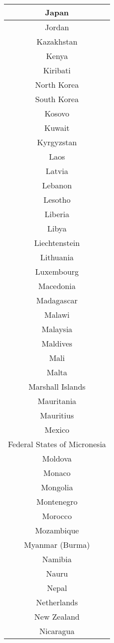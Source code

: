 \documentclass{article}
\begin{document}
\begin{center}
\begin{tabular} {|| c ||}
Japan\\ \hline 
Jordan\\ \hline 
Kazakhstan\\ \hline 
Kenya\\ \hline 
Kiribati\\ \hline 
North Korea\\ \hline 
South Korea\\ \hline 
Kosovo\\ \hline 
Kuwait\\ \hline 
Kyrgyzstan\\ \hline 
Laos\\ \hline 
Latvia\\ \hline 
Lebanon\\ \hline 
Lesotho\\ \hline 
Liberia\\ \hline 
Libya\\ \hline 
Liechtenstein\\ \hline 
Lithuania\\ \hline 
Luxembourg\\ \hline 
Macedonia\\ \hline 
Madagascar\\ \hline 
Malawi\\ \hline 
Malaysia\\ \hline 
Maldives\\ \hline 
Mali\\ \hline 
Malta\\ \hline 
Marshall Islands\\ \hline 
Mauritania\\ \hline 
Mauritius\\ \hline 
Mexico\\ \hline 
Federal States of Micronesia\\ \hline 
Moldova\\ \hline 
Monaco\\ \hline 
Mongolia\\ \hline 
Montenegro\\ \hline 
Morocco\\ \hline 
Mozambique\\ \hline 
Myanmar (Burma)\\ \hline 
Namibia\\ \hline 
Nauru\\ \hline 
Nepal\\ \hline 
Netherlands\\ \hline 
New Zealand\\ \hline 
Nicaragua\\ \hline 

\end{tabular}
\end{center}
\end{document}
